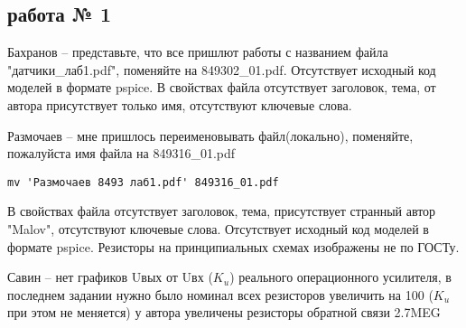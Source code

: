 \documentclass[a4paper,landscape,11pt]{article}
\begin{document}
\subsection{работа № 1}
Бахранов  -- представьте, что все пришлют работы с названием файла "датчики\_лаб1.pdf", поменяйте на  849302\_01.pdf. Отсутствует исходный код моделей в формате pspice.
В свойствах файла отсутствует заголовок, тема, от автора присутствует только имя, отсутствуют ключевые слова.

Размочаев -- мне пришлось переименовывать файл(локально), поменяйте, пожалуйста имя файла на  849316\_01.pdf
\begin{verbatim}
mv 'Размочаев 8493 лаб1.pdf' 849316_01.pdf
\end{verbatim}
В свойствах файла отсутствует заголовок, тема, присутствует странный автор "Malov", отсутствуют ключевые слова. Отсутствует исходный код моделей в формате pspice.
Резисторы на принципиальных схемах изображены не по ГОСТу.

Савин -- нет графиков Uвых от Uвх ($K_u$) реального операционного усилителя, в последнем задании нужно было номинал всех  резисторов увеличить на 100 ($K_u$ при этом не меняется) 
у автора увеличены резисторы обратной связи 2.7MEG 
\end{document}
